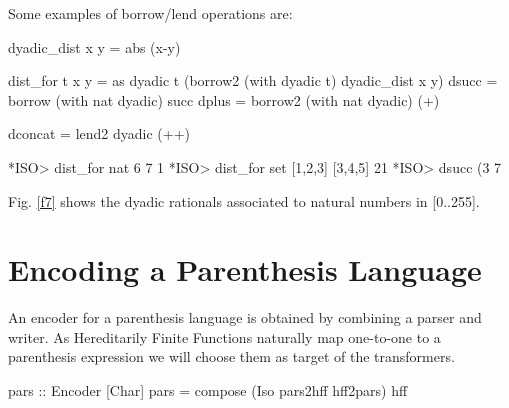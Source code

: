 \documentclass[]{INCLUDES/llncs}
\begin{document}
Some examples of borrow/lend operations are:
\begin{code}
dyadic_dist x y = abs (x-y)

dist_for t x y =  as dyadic t 
  (borrow2 (with dyadic t) dyadic_dist x y)
dsucc = borrow (with nat dyadic) succ
dplus = borrow2 (with nat dyadic) (+)

dconcat = lend2 dyadic (++)
\end{code}
\begin{codex}
*ISO> dist_for nat  6 7
1%
*ISO> dist_for set [1,2,3] [3,4,5]
21%
*ISO> dsucc (3%
7%
\end{codex}
Fig. \ref{f7} shows the dyadic rationals associated
to natural numbers in [0..255].


\section{Encoding a Parenthesis Language}

An encoder for a parenthesis language is obtained by
combining a parser and writer. As Hereditarily Finite Functions
naturally map one-to-one to a parenthesis expression
we will choose them as target of the transformers.
\begin{code}
pars :: Encoder [Char]
pars = compose (Iso pars2hff hff2pars) hff
\end{code}
\end{document}
